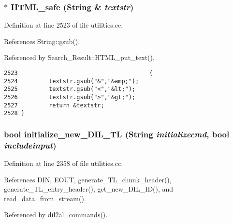 \subsubsection{$\ast$ HTML\_\-safe ({\bf String} \& {\em textstr})}\label{utilities_8cc_a60}




Definition at line 2523 of file utilities.cc.

References String::gsub().

Referenced by Search\_\-Result::HTML\_\-put\_\-text().



\footnotesize\begin{verbatim}2523                                      {
2524         textstr.gsub("&","&amp;");
2525         textstr.gsub("<","&lt;");
2526         textstr.gsub(">","&gt;");
2527         return &textstr;
2528 }
\end{verbatim}\normalsize 
{}
\subsubsection{\setlength{\rightskip}{0pt plus 5cm}bool initialize\_\-new\_\-DIL\_\-TL ({\bf String} {\em initializecmd}, bool {\em includeinput})}\label{utilities_8cc_a49}




Definition at line 2358 of file utilities.cc.

References DIN, EOUT, generate\_\-TL\_\-chunk\_\-header(), generate\_\-TL\_\-entry\_\-header(), get\_\-new\_\-DIL\_\-ID(), and read\_\-data\_\-from\_\-stream().

Referenced by dil2al\_\-commands().



